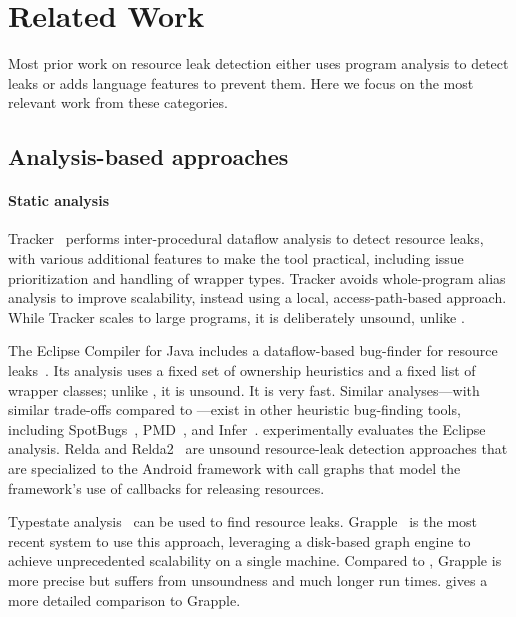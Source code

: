 \section{Related Work}
\label{sec:relatedwork}

Most prior work on resource leak detection either uses
program analysis to detect leaks or adds language features to prevent
them. Here we focus on the most relevant work from these categories.

\subsection{Analysis-based approaches}\label{sec:rw-analysis}


\paragraph{Static analysis}
Tracker~\cite{TorlakC10} performs inter-procedural dataflow analysis to detect
resource leaks, with various additional features to make the tool practical,
including issue prioritization and handling of wrapper types.  Tracker avoids
whole-program alias analysis to improve scalability, instead using a local,
access-path-based approach.  While Tracker scales to large programs, it is
deliberately unsound, unlike \tool.

The Eclipse Compiler for Java includes a dataflow-based
bug-finder for resource leaks~\cite{ecj-resource-leak}. Its analysis
uses a fixed set of ownership heuristics and a fixed list of wrapper
classes; unlike \tool, it is unsound. It is very fast.  Similar analyses---with similar trade-offs
compared to \tool---exist in other heuristic bug-finding tools,
including SpotBugs~\cite{spotbugs-resource-leak},
PMD~\cite{pmd-resource-leak}, and Infer~\cite{infer-resource-leak}.
 experimentally evaluates the Eclipse analysis.
Relda and Relda2~\cite{guo2013characterizing,wu2016relda2} are unsound
resource-leak detection approaches that are specialized to the Android framework
with call graphs that model the framework's use of callbacks for
releasing resources.

Typestate analysis~\cite{StromY86,FinkYDRG2008} can be used to
find resource leaks.  Grapple~\cite{zuo2019grapple} is the most recent system to
use this approach, leveraging a disk-based graph engine to achieve unprecedented
scalability on a single machine.  Compared to \tool, Grapple
is more precise but
suffers from unsoundness and much longer run times.
 gives a more detailed comparison to Grapple.

